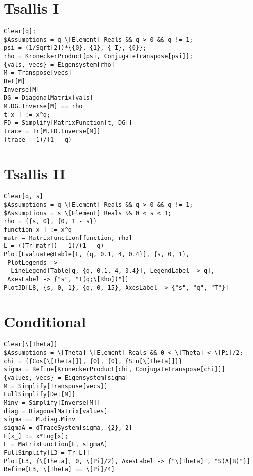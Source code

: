 \section{Tsallis I}
\begin{verbatim}
Clear[q];
$Assumptions = q \[Element] Reals && q > 0 && q != 1;
psi = (1/Sqrt[2])*{{0}, {1}, {-I}, {0}};
rho = KroneckerProduct[psi, ConjugateTranspose[psi]];
{vals, vecs} = Eigensystem[rho]
M = Transpose[vecs]
Det[M]
Inverse[M]
DG = DiagonalMatrix[vals]
M.DG.Inverse[M] == rho
t[x_] := x^q;
FD = Simplify[MatrixFunction[t, DG]]
trace = Tr[M.FD.Inverse[M]]
(trace - 1)/(1 - q)
\end{verbatim}
\section{Tsallis II}
\begin{verbatim}
Clear[q, s]
$Assumptions = q \[Element] Reals && q > 0 && q != 1;
$Assumptions = s \[Element] Reals && 0 < s < 1;
rho = {{s, 0}, {0, 1 - s}}
function[x_] := x^q
matr = MatrixFunction[function, rho]
L = ((Tr[matr]) - 1)/(1 - q)
Plot[Evaluate@Table[L, {q, 0.1, 4, 0.4}], {s, 0, 1}, 
 PlotLegends -> 
  LineLegend[Table[q, {q, 0.1, 4, 0.4}], LegendLabel -> q], 
 AxesLabel -> {"s", "T(q;\[Rho])"}]
Plot3D[L8, {s, 0, 1}, {q, 0, 15}, AxesLabel -> {"s", "q", "T"}]
\end{verbatim}
\section{Conditional}
\begin{verbatim}
Clear[\[Theta]]
$Assumptions = \[Theta] \[Element] Reals && 0 < \[Theta] < \[Pi]/2;
chi = {{Cos[\[Theta]]}, {0}, {0}, {Sin[\[Theta]]}}
sigma = Refine[KroneckerProduct[chi, ConjugateTranspose[chi]]]
{values, vecs} = Eigensystem[sigma]
M = Simplify[Transpose[vecs]]
FullSimplify[Det[M]]
Minv = Simplify[Inverse[M]]
diag = DiagonalMatrix[values]
sigma == M.diag.Minv
sigmaA = dTraceSystem[sigma, {2}, 2]
F[x_] := x*Log[x];
L = MatrixFunction[F, sigmaA]
FullSimplify[L3 = Tr[L]]
Plot[L3, {\[Theta], 0, \[Pi]/2}, AxesLabel -> {"\[Theta]", "S(A|B)"}]
Refine[L3, \[Theta] == \[Pi]/4]
\end{verbatim}
